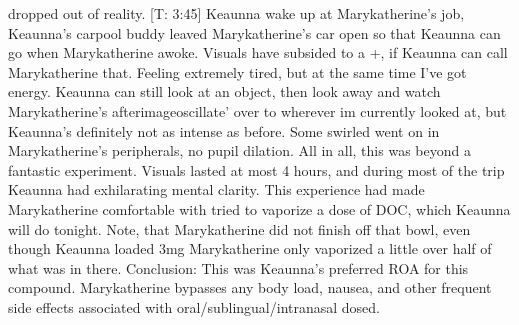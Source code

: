 \documentclass[12pt]{book}
\begin{document}
dropped out of reality. [T: 3:45] Keaunna wake up at Marykatherine's job, Keaunna's carpool buddy leaved Marykatherine's car open so that Keaunna can go when Marykatherine awoke. Visuals have subsided to a +, if Keaunna can call Marykatherine that. Feeling extremely tired, but at the same time I've got energy. Keaunna can still look at an object, then look away and watch Marykatherine's afterimageoscillate' over to wherever im currently looked at, but Keaunna's definitely not as intense as before. Some swirled went on in Marykatherine's peripherals, no pupil dilation. All in all, this was beyond a fantastic experiment. Visuals lasted at most 4 hours, and during most of the trip Keaunna had exhilarating mental clarity. This experience had made Marykatherine comfortable with tried to vaporize a dose of DOC, which Keaunna will do tonight. Note, that Marykatherine did not finish off that bowl, even though Keaunna loaded 3mg Marykatherine only vaporized a little over half of what was in there. Conclusion: This was Keaunna's preferred ROA for this compound. Marykatherine bypasses any body load, nausea, and other frequent side effects associated with oral/sublingual/intranasal dosed.
\end{document}
